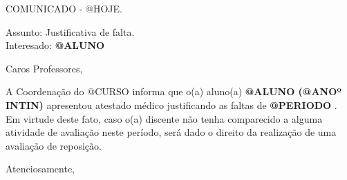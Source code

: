 


\hspace{.2cm}


\noindent COMUNICADO - @HOJE.

\noindent Assunto: Justificativa de falta.\\
Interesado: {\bf @ALUNO }

\noindent Caros Professores,

\onehalfspacing A Coordenação do @CURSO informa que o(a) aluno(a) {\bf @ALUNO (@ANOº INTIN) } apresentou atestado médico justificando as faltas de {\bf @PERIODO }. Em virtude deste fato, caso o(a) discente não tenha comparecido a alguma atividade de avaliação neste período, será dado o direito da realização de uma avaliação de reposição.

\noindent Atenciosamente,



